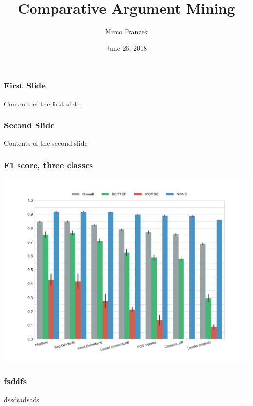 \documentclass[11pt,aspectratio=169]{beamer}
\title{Comparative Argument Mining}
\author{Mirco Franzek}
\date{June 26, 2018}
\begin{document}
    \maketitle
    \begin{frame}
        \frametitle{First Slide}
        Contents of the first slide
    \end{frame}
    \begin{frame}
        \frametitle{Second Slide}
        Contents of the second slide
    \end{frame}

    \begin{frame}
        \frametitle{F1 score, three classes}
        \begin{center}
            \includegraphics[scale=0.3]{images/f1-False}
        \end{center}
    \end{frame}

    \begin{frame}
        \frametitle{fsddfs}
        dssdsadsads
    \end{frame}
\end{document}
